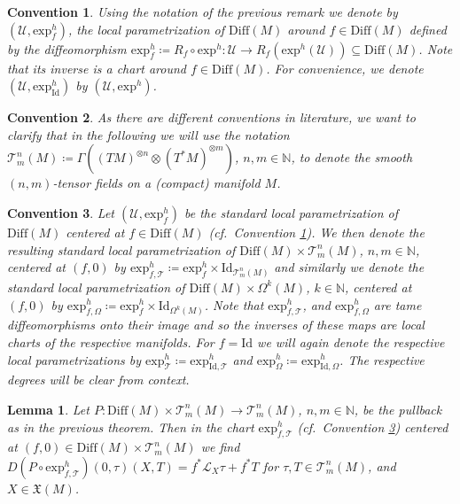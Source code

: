 \documentclass[10pt,a4paper]{amsart}
\newtheorem{convention}{Convention}
\newtheorem{lemma}{Lemma}
\newcommand{\Diff}{\mathrm{Diff}(M)}
\newcommand{\Forms}[1]{\Omega^{#1}(M)}
\newcommand{\Id}{\mathrm{Id}}
\newcommand{\LieD}{\mathcal{L}}
\newcommand{\N}{\mathbb{N}}
\newcommand{\Ucal}{\mathcal{U}}
\newcommand{\VFs}{\mathfrak{X}(M)}
\newcommand{\eh}[1]{\mathrm{exp}^h(#1)}
\newcommand{\exh}{\mathrm{exp}^h}
\newcommand{\tens}{\otimes}
\newcommand{\tensf}[2]{\mathcal{T}^{#1}_{#2}(M)}
\begin{document}
\begin{convention}
\label{Conv:ChartsOnDiff}
Using the notation of the previous remark we denote by $(\Ucal,\exh_f)$, the local parametrization of $\Diff$ around $f\in \Diff$ defined by the diffeomorphism $\exh_f\coloneqq R_f\circ\exh:\Ucal\to R_f(\eh{\Ucal})\subseteq \Diff$. Note that its inverse is a chart around $f\in \Diff$. For convenience, we denote $(\Ucal,\exh_{\Id})$ by $(\Ucal,\exh)$.
\end{convention}

\begin{convention}
\label{Conv:tensfields}
As there are different conventions in literature, we want to clarify that in the following we will use the notation $\tensf{n}{m}\coloneqq \Gamma((TM)^{\tens n}\tens(T^*M)^{\tens m})$, $n,m\in \N$, to denote the smooth $(n,m)$-tensor fields on a (compact) manifold $M$.
\end{convention}

\begin{convention}
\label{Conv:StandChartOnDifftimesTensOrForms}
Let $(\Ucal,\exh_f)$ be the standard local parametrization of $\Diff$ centered at $f\in \Diff$ (cf.~Convention \ref{Conv:ChartsOnDiff}). We then denote the resulting standard local parametrization of $\Diff \times \tensf{n}{m}$, $n,m \in \N$, centered at $(f,0)$ by
$\exh_{f,\mathcal T}\coloneqq \exh_f\times \mathrm{Id}_{\tensf{n}{m}}$ and similarly we denote the standard local parametrization of $\Diff \times \Forms{k}$, $k\in \N$, centered at $(f,0)$ by $\exh_{f,\Omega}\coloneqq \exh_f \times \mathrm{Id}_{\Forms{k}}$. Note that $\exh_{f,\mathcal T}$, and $\exh_{f,\Omega}$ are tame diffeomorphisms onto their image and so the inverses of these maps are local charts of the respective manifolds. For $f=\Id$ we will again denote the respective local parametrizations by $\exh_{\mathcal{T}}\coloneqq \exh_{\Id,\mathcal{T}}$ and $\exh_{\Omega}\coloneqq \exh_{\Id,\Omega}$. The respective degrees will be clear from context. 
\end{convention}

\begin{lemma}
\label{Lemma:PullbackDifferential}
Let $P:\Diff\times \tensf{n}{m}\to \tensf{n}{m}$, $n,m\in \N$, be the pullback as in the previous theorem. Then in the chart $\exh_{f,\mathcal T}$ (cf.~Convention \ref{Conv:StandChartOnDifftimesTensOrForms}) centered at $(f,0)\in \Diff\times \tensf{n}{m}$ we find $D(P\circ \exh_{f,\mathcal T})(0,\tau)(X,T)=f^*\LieD_X \tau+f^*T$ for
$\tau,T\in \tensf{n}{m}$, and $X\in \VFs$.  
\end{lemma}
\end{document}
